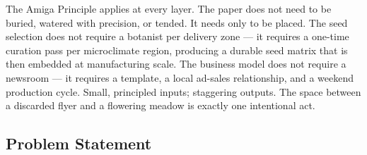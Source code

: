 \documentclass[11pt,letterpaper]{article}
\begin{document}
The Amiga Principle applies at every layer. The paper does not need to be buried, watered with precision, or tended. It needs only to be placed. The seed selection does not require a botanist per delivery zone --- it requires a one-time curation pass per microclimate region, producing a durable seed matrix that is then embedded at manufacturing scale. The business model does not require a newsroom --- it requires a template, a local ad-sales relationship, and a weekend production cycle. Small, principled inputs; staggering outputs. The space between a discarded flyer and a flowering meadow is exactly one intentional act.

\subsection{Problem Statement}
\end{document}
